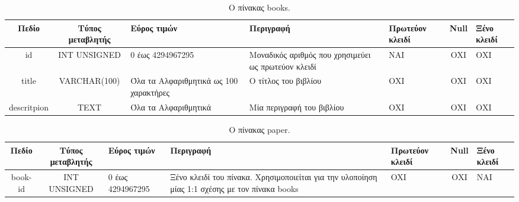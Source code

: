 \documentclass{assignment}
\begin{document}
\begin{landscape}
\begin{table}[htbp]
\begin{center}
  \begin{tabular}{|c|c|m{}|m{}|m{2.0cm}|c|m{1.5cm}|}
    \hline
    {\bf Πεδίο} & {\bf Τύπος μεταβλητής} & {\bf Εύρος τιμών} & {\bf Περιγραφή} & {\bf Πρωτεύον κλειδί} & {\bf Null} & {\bf Ξένο κλειδί} \\ \hline
    id & INT UNSIGNED & 0 έως 4294967295 & Μοναδικός αριθμός που χρησιμεύει ως πρωτεύον κλειδί & ΝΑΙ & ΟΧΙ & ΟΧΙ \\ \hline
    title & VARCHAR(100) & Όλα τα Αλφαριθμητικά ως 100 χαρακτήρες & Ο τίτλος του βιβλίου & ΟΧΙ & ΟΧΙ & ΟΧΙ \\ \hline
    descritpion & TEXT & Όλα τα Αλφαριθμητικά & Μία περιγραφή του βιβλίου & ΟΧΙ & ΟΧΙ & ΟΧΙ \\ \hline
  \end{tabular}
\caption{Ο πίνακας books.}
\label{table:db_table:books}
\end{center}
\end{table}

\begin{table}[htbp]
\begin{center}
  \begin{tabular}{|c|c|m{}|m{}|m{2.0cm}|c|m{1.5cm}|}
    \hline
    {\bf Πεδίο} & {\bf Τύπος μεταβλητής} & {\bf Εύρος τιμών} & {\bf Περιγραφή} & {\bf Πρωτεύον κλειδί} & {\bf Null} & {\bf Ξένο κλειδί} \\ \hline
    book-id & INT UNSIGNED & 0 έως 4294967295 & Ξένο κλειδί του πίνακα. Χρησιμοποιείται για την υλοποίηση μίας 1:1 σχέσης με τον πίνακα books & OXI & ΟΧΙ & NAI \\ \hline
  \end{tabular}
\caption{Ο πίνακας paper.}
\label{table:db_table:paper}
\end{center}
\end{table}
\end{landscape}
\end{document}
